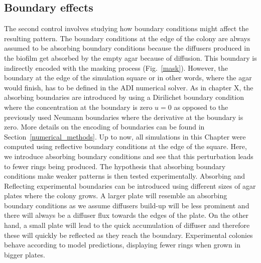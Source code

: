 \subsection{Boundary effects}
The second control involves studying how boundary conditions might affect the resulting pattern.
The boundary conditions at the edge of the colony are always assumed to be absorbing boundary conditions because the diffusers produced in the biofilm get absorbed by the empty agar because of diffusion.
This boundary is indirectly encoded with the masking process (Fig.~\ref{mask}).
However, the boundary at the edge of the simulation square or in other words, where the agar would finish, has to be defined in the ADI numerical solver.
As in chapter X, the absorbing boundaries are introduced by using a Dirilichet boundary condition where the concentration at the boundary is zero $u=0$ as opposed to the previously used Neumann boundaries where the derivative at the boundary is zero.
More details on the encoding of boundaries can be found in Section~\ref{numerical_methods}.
Up to now, all simulations in this Chapter were computed using reflective boundary conditions at the edge of the square.
Here, we introduce absorbing boundary conditions and see that this perturbation leads to fewer rings being produced.
The hypothesis that absorbing boundary conditions make weaker patterns is then tested experimentally.
Absorbing and Reflecting experimental boundaries can be introduced using different sizes of agar plates where the colony grows.
A larger plate will resemble an absorbing boundary conditions as we assume diffusers build-up will be less prominent and there will always be a diffuser flux towards the edges of the plate.
On the other hand, a small plate will lead to the quick accumulation of diffuser and therefore these will quickly be reflected as they reach the boundary. %
Experimental colonies behave according to model predictions, displaying fewer rings when grown in bigger plates.


